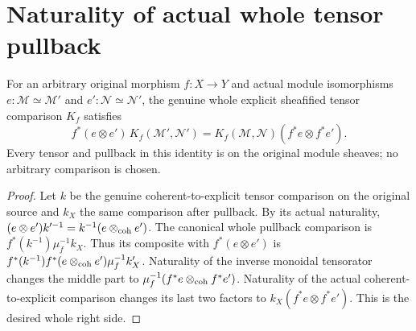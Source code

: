 \section{Naturality of actual whole tensor pullback}

\begin{lemma}
\label{lem:cartier-original-tensor-pullback-naturality}
\leanok
{}
For an arbitrary original morphism $f:X\to Y$ and actual module
isomorphisms $e:\mathcal M\simeq\mathcal M'$ and
$e':\mathcal N\simeq\mathcal N'$, the genuine whole explicit
sheafified tensor comparison $K_f$ satisfies
\[
 f^*(e\otimes e')\,K_f(\mathcal M',\mathcal N')
 =K_f(\mathcal M,\mathcal N)(f^*e\otimes f^*e').
\]
Every tensor and pullback in this identity is on the original module
sheaves; no arbitrary comparison is chosen.
\end{lemma}
\begin{proof}
Let $k$ be the genuine coherent-to-explicit tensor comparison on the
original source and $k_X$ the same comparison after pullback. By its
actual naturality, $(e\otimes e')k'^{-1}=k^{-1}(e\otimes_{\rm coh}e')$.
The canonical whole pullback comparison is
$f^*(k^{-1})\mu_f^{-1}k_X$. Thus its composite with $f^*(e\otimes e')$
is $f^*(k^{-1})f^*(e\otimes_{\rm coh}e')\mu_f^{-1}k'_X$.
Naturality of the inverse monoidal tensorator changes the middle part
to $\mu_f^{-1}(f^*e\otimes_{\rm coh}f^*e')$. Naturality of the actual
coherent-to-explicit comparison changes its last two factors to
$k_X(f^*e\otimes f^*e')$. This is the desired whole right side.
\end{proof}
